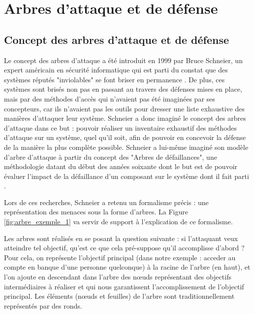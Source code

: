 \section{Arbres d'attaque et de défense}
	\label{sec:etat_art}

    \subsection{Concept des arbres d'attaque et de défense}
        Le concept des arbres d'attaque a été introduit en 1999 par Bruce Schneier, un expert américain en sécurité informatique qui est parti du constat que des systèmes réputés "inviolables" se font briser en permanence \cite{doc_Schneier}. De plus, ces systèmes sont brisés non pas en passant au travers des défenses mises en place, mais par des méthodes d'accès qui n'avaient pas été imaginées par ses concepteurs, car ils n'avaient pas les outils pour dresser une liste exhaustive des manières d'attaquer leur système. Schneier a donc imaginé le concept des arbres d'attaque dans ce but : pouvoir réaliser un inventaire exhaustif des méthodes d'attaque sur un système, quel qu'il soit, afin de pouvoir en concevoir la défense de la manière la plus complète possible. Schneier a lui-même imaginé son modèle d'arbre d'attaque à partir du concept des "Arbres de défaillances", une méthodologie datant du début des années soixante dont le but est de pouvoir évaluer l'impact de la défaillance d'un composant sur le système dont il fait parti \cite{defaillanceTree}. 

		Lors de ces recherches, Schneier a retenu un formalisme précis : une représentation des menaces sous la forme d'arbres. La Figure \ref{fig:arbre_exemple_1} va servir de support à l'explication de ce formalisme.

        Les arbres sont réalisés en se posant la question suivante : si l'attaquant veux atteindre tel objectif, qu'est ce que cela pré-suppose qu'il accomplisse d'abord ? Pour cela, on représente l'objectif principal (dans notre exemple : acceder au compte en banque d'une personne quelconque) à la racine de l'arbre (en haut), et l'on ajoute en descendant dans l'arbre des nœuds représentant des objectifs intermédiaires à réaliser et qui nous garantissent l'accomplissement de l'objectif principal. Les éléments (nœuds et feuilles) de l'arbre sont traditionnellement représentés par des ronds. 

